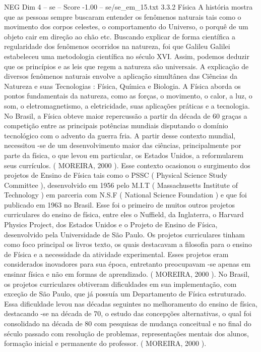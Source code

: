 \begin{textsample}{NEG Dim 4 – se – Score -1.00 – se/se\_em\_15.txt}  \label{ex:f4_neg_142}
3.3.2 Física A história mostra que as pessoas sempre buscaram entender os fenômenos naturais tais como o movimento dos corpos celestes, o comportamento do Universo, o porquê de um objeto cair em direção ao chão etc.
Buscando explicar de forma científica a regularidade dos fenômenos ocorridos na natureza, foi que Galileu Galilei estabeleceu uma metodologia científica no século XVI.
Assim, podemos deduzir que os princípios e as leis que regem a natureza são universais.
A explicação de diversos fenômenos naturais envolve a aplicação simultânea das Ciências da Natureza e suas Tecnologias : Física, Química e Biologia.
A Física aborda os pontos fundamentais da natureza, como as forças, o movimento, o calor, a luz, o som, o eletromagnetismo, a eletricidade, suas aplicações práticas e a tecnologia.
No Brasil, a Física obteve maior repercussão a partir da década de 60 graças a competição entre as principais potências mundiais disputando o domínio tecnológico com o advento da guerra fria.
A partir desse contexto mundial, necessitou -se de um desenvolvimento maior das ciências, principalmente por parte da física, o que levou em particular, os Estados Unidos, a reformularem seus currículos. ( MOREIRA, 2000 ).
Esse contexto ocasionou o surgimento dos projetos de Ensino de Física tais como o PSSC ( Physical Science Study Committee ), desenvolvido em 1956 pelo M.I.T ( Massachusetts Institute of Technology ) em parceria com N.S.F ( National Science Foundation ) e que foi publicado em 1963 no Brasil.
Esse foi o primeiro de muitos outros projetos curriculares do ensino de física, entre eles o Nuffield, da Inglaterra, o Harvard Physics Project, dos Estados Unidos e o Projeto de Ensino de Física, desenvolvido pela Universidade de São Paulo.
Os projetos curriculares tinham como foco principal os livros texto, os quais destacavam a filosofia para o ensino de Física e a necessidade da atividade experimental.
Esses projetos eram considerados inovadores para sua época, entretanto preocupavam -se apenas em ensinar física e não em formas de aprendizado. ( MOREIRA, 2000 ).
No Brasil, os projetos curriculares obtiveram dificuldades em sua implementação, com exceção de São Paulo, que já possuía um Departamento de Física estruturado.
Essa dificuldade levou nas décadas seguintes no melhoramento do ensino de física, destacando -se na década de 70, o estudo das concepções alternativas, o qual foi consolidado na década de 80 com pesquisas de mudança conceitual e no final do século passado com resolução de problemas, representações mentais dos alunos, formação inicial e permanente do professor. ( MOREIRA, 2000 ).

\end{textsample}
